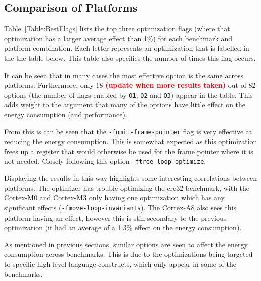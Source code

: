 \documentclass[twocolumn]{article}
\newcommand{\todo}[1]{\textbf{\textcolor{red}{#1}}}
\begin{document}

\subsection{Comparison of Platforms}

Table~\ref{Table:BestFlags} lists the top three optimization flags (where that optimization has a larger average effect than 1\%) for each benchmark and platform combination.  Each letter represents an optimization that is labelled in the the table below. This table also specifies the number of times this flag occurs.

It can be seen that in many cases the most effective option is the same across platforms. Furthermore, only 18 \todo{(update when more results taken)} out of 82 options (the number of flags enabled by \texttt{O1}, \texttt{O2} and \texttt{O3}) appear in the table. This adds weight to the argument that many of the options have little effect on the energy consumption (and performance).

From this is can be seen that the \texttt{-fomit-frame-pointer} flag is very effective at reducing the energy consumption. This is somewhat expected as this optimization frees up a register that would otherwise be used for the frame pointer where it is not needed. Closely following this option \texttt{-ftree-loop-optimize}.


Displaying the results in this way highlights some interesting correlations between platforms. The optimizer has trouble optimizing the crc32 benchmark, with the Cortex-M0 and Cortex-M3 only having one optimization which has any significant effects (\texttt{-fmove-loop-invariants}). The Cortex-A8 also sees this platform having an effect, however this is still secondary to the previous optimization (it had an average of a 1.3\% effect on the energy consumption).

As mentioned in previous sections, similar options are seen to affect the energy consumption across benchmarks. This is due to the optimizations being targeted to specific high level language constructs, which only appear in some of the benchmarks.
\end{document}

